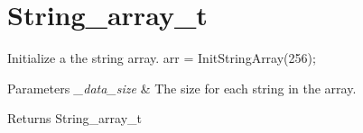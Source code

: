 \hypertarget{String_array_t-example}{}\section{String\+\_\+array\+\_\+t}
Initialize a the string array. arr = Init\+String\+Array(256); 
\begin{DoxyParams}{Parameters}
{\em \+\_\+data\+\_\+size} & The size for each string in the array. \\
\hline
\end{DoxyParams}
\begin{DoxyReturn}{Returns}
String\+\_\+array\+\_\+t
\end{DoxyReturn}

\begin{DoxyCodeInclude}
\end{DoxyCodeInclude}
 